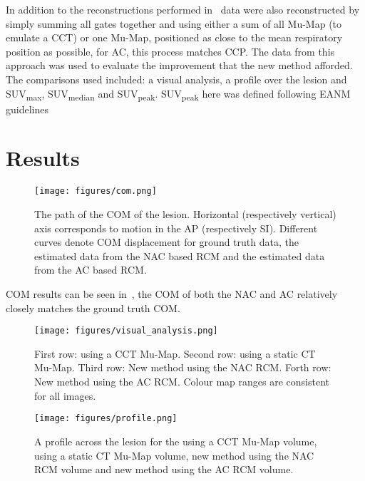         In addition to the reconstructions performed in~ data were also reconstructed by simply summing all gates together and using either a sum of all \gls{Mu-Map} (to emulate a \gls{CCT}) or one \gls{Mu-Map}, positioned as close to the mean respiratory position as possible, for \gls{AC}, this process matches \gls{CCP}. The data from this approach was used to evaluate the improvement that the new method afforded. The comparisons used included: a visual analysis, a profile over the lesion and \gls{SUV}\textsubscript{max}, \gls{SUV}\textsubscript{median} and \gls{SUV}\textsubscript{peak}. \gls{SUV}\textsubscript{peak} here was defined following \gls{EANM} guidelines~\cite{Boellaard2015FDG2.0}

\section{Results} \label{sec:results}
    \begin{figure}
        \centering
        \texttt{[image: figures/com.png]}
        \captionsetup{singlelinecheck=false, justification=centering}
        \caption{The path of the \gls{COM} of the lesion. Horizontal (respectively vertical) axis corresponds to motion in the \gls{AP} (respectively \gls{SI}). Different curves denote \gls{COM} displacement for  ground truth data, the estimated data from the \gls{NAC} based \gls{RCM} and the estimated data from the \gls{AC} based \gls{RCM}.}
        \label{fig:com}
    \end{figure}
    
    \gls{COM} results can be seen in~, the \gls{COM} of both the \gls{NAC} and \gls{AC} relatively closely matches the ground truth \gls{COM}.
    
    \begin{figure}
        \centering
        \texttt{[image: figures/visual\_analysis.png]}
        \captionsetup{singlelinecheck=false, justification=centering}
        \caption{First row:  using a \gls{CCT} \gls{Mu-Map}. Second row:  using a static \gls{CT} \gls{Mu-Map}. Third row: New method using the \gls{NAC} \gls{RCM}. Forth row: New method using the \gls{AC} \gls{RCM}. Colour map ranges are consistent for all images.}
        \label{fig:visual_analysis}
    \end{figure}
    
    \begin{figure}
        \centering
        \texttt{[image: figures/profile.png]}
        \captionsetup{singlelinecheck=false, justification=centering}
        \caption{A profile across the lesion for the  using a \gls{CCT} \gls{Mu-Map} volume,  using a static \gls{CT} \gls{Mu-Map} volume, new method using the \gls{NAC} \gls{RCM} volume and new method using the \gls{AC} \gls{RCM} volume.}
        \label{fig:profile}
    \end{figure}
    
